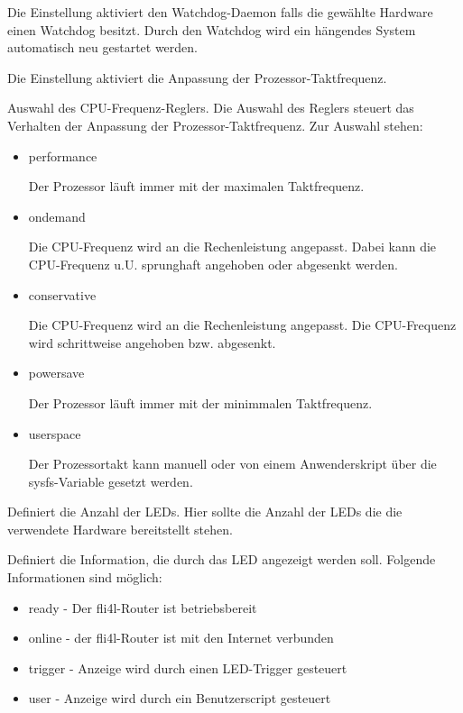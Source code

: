 \begin{description}
  Die Einstellung  aktiviert den Watchdog-Daemon falls die gewählte 
  Hardware einen Watchdog besitzt. Durch den Watchdog wird ein hängendes System 
  automatisch neu gestartet werden.

  Die Einstellung  aktiviert die Anpassung der Prozessor-Taktfrequenz.

  Auswahl des CPU-Frequenz-Reglers. Die Auswahl des Reglers steuert das Verhalten
  der Anpassung der Prozessor-Taktfrequenz. Zur Auswahl stehen:

  \begin{itemize}
    \item performance

      Der Prozessor läuft immer mit der maximalen Taktfrequenz.

    \item ondemand

      Die CPU-Frequenz wird an die Rechenleistung angepasst. Dabei kann die
      CPU-Frequenz u.U. sprunghaft angehoben oder abgesenkt werden. 

    \item conservative

      Die CPU-Frequenz wird an die Rechenleistung angepasst. Die CPU-Frequenz
      wird schrittweise angehoben bzw. abgesenkt. 

    \item powersave

      Der Prozessor läuft immer mit der minimmalen Taktfrequenz.

    \item userspace

      Der Prozessortakt kann manuell oder von einem Anwenderskript über die
      sysfs-Variable 
      gesetzt werden.

  \end{itemize}

  Definiert die Anzahl der LEDs. Hier sollte die Anzahl der LEDs die 
  die verwendete Hardware bereitstellt stehen.
  
  Definiert die Information, die durch das LED angezeigt werden soll.
    Folgende Informationen sind möglich:
  \begin{itemize}
    \item ready - Der fli4l-Router ist betriebsbereit\footnotemark
    \item online - der fli4l-Router ist mit den Internet verbunden
    \item trigger - Anzeige wird durch einen LED-Trigger gesteuert
    \item user - Anzeige wird durch ein Benutzerscript gesteuert
  \end{itemize}


\end{description}
